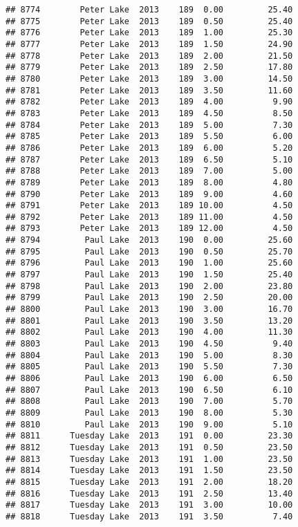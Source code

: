 \documentclass[
]{article}
\begin{document}
\begin{verbatim}
## 8774        Peter Lake  2013    189  0.00         25.40
## 8775        Peter Lake  2013    189  0.50         25.40
## 8776        Peter Lake  2013    189  1.00         25.30
## 8777        Peter Lake  2013    189  1.50         24.90
## 8778        Peter Lake  2013    189  2.00         21.50
## 8779        Peter Lake  2013    189  2.50         17.80
## 8780        Peter Lake  2013    189  3.00         14.50
## 8781        Peter Lake  2013    189  3.50         11.60
## 8782        Peter Lake  2013    189  4.00          9.90
## 8783        Peter Lake  2013    189  4.50          8.50
## 8784        Peter Lake  2013    189  5.00          7.30
## 8785        Peter Lake  2013    189  5.50          6.00
## 8786        Peter Lake  2013    189  6.00          5.20
## 8787        Peter Lake  2013    189  6.50          5.10
## 8788        Peter Lake  2013    189  7.00          5.00
## 8789        Peter Lake  2013    189  8.00          4.80
## 8790        Peter Lake  2013    189  9.00          4.60
## 8791        Peter Lake  2013    189 10.00          4.50
## 8792        Peter Lake  2013    189 11.00          4.50
## 8793        Peter Lake  2013    189 12.00          4.50
## 8794         Paul Lake  2013    190  0.00         25.60
## 8795         Paul Lake  2013    190  0.50         25.70
## 8796         Paul Lake  2013    190  1.00         25.60
## 8797         Paul Lake  2013    190  1.50         25.40
## 8798         Paul Lake  2013    190  2.00         23.80
## 8799         Paul Lake  2013    190  2.50         20.00
## 8800         Paul Lake  2013    190  3.00         16.70
## 8801         Paul Lake  2013    190  3.50         13.20
## 8802         Paul Lake  2013    190  4.00         11.30
## 8803         Paul Lake  2013    190  4.50          9.40
## 8804         Paul Lake  2013    190  5.00          8.30
## 8805         Paul Lake  2013    190  5.50          7.30
## 8806         Paul Lake  2013    190  6.00          6.50
## 8807         Paul Lake  2013    190  6.50          6.10
## 8808         Paul Lake  2013    190  7.00          5.70
## 8809         Paul Lake  2013    190  8.00          5.30
## 8810         Paul Lake  2013    190  9.00          5.10
## 8811      Tuesday Lake  2013    191  0.00         23.30
## 8812      Tuesday Lake  2013    191  0.50         23.50
## 8813      Tuesday Lake  2013    191  1.00         23.50
## 8814      Tuesday Lake  2013    191  1.50         23.50
## 8815      Tuesday Lake  2013    191  2.00         18.20
## 8816      Tuesday Lake  2013    191  2.50         13.40
## 8817      Tuesday Lake  2013    191  3.00         10.00
## 8818      Tuesday Lake  2013    191  3.50          7.40

\end{verbatim}
\end{document}
